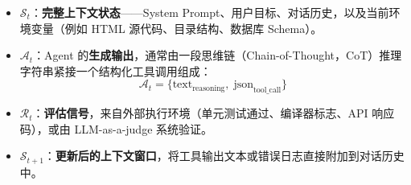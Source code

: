 \begin{itemize}
  \item $\mathcal{S}_t$：\textbf{完整上下文状态}——System Prompt、用户目标、对话历史，以及当前环境变量（例如 HTML 源代码、目录结构、数据库 Schema）。
  \item $\mathcal{A}_t$：Agent 的\textbf{生成输出}，通常由一段思维链（Chain-of-Thought，CoT）推理字符串紧接一个结构化工具调用组成：
\begin{equation}
\mathcal{A}_t = \{\text{text}_{\text{reasoning}},\; \text{json}_{\text{tool\_call}}\}
\end{equation}
  \item $\mathcal{R}_t$：\textbf{评估信号}，来自外部执行环境（单元测试通过、编译器标志、API 响应码），或由 LLM-as-a-judge 系统验证。
  \item $\mathcal{S}_{t+1}$：\textbf{更新后的上下文窗口}，将工具输出文本或错误日志直接附加到对话历史中。
\end{itemize}

